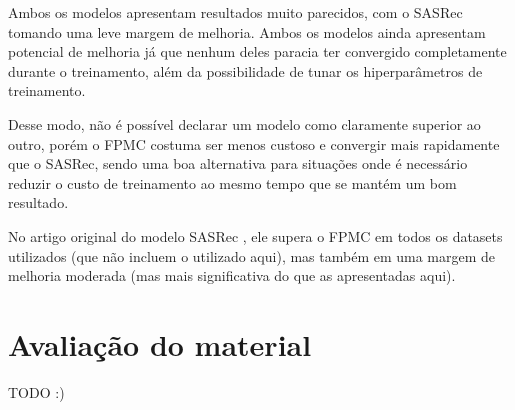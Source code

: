 Ambos os modelos apresentam resultados muito parecidos, com o SASRec tomando uma
leve margem de melhoria. Ambos os modelos ainda apresentam potencial de melhoria
já que nenhum deles paracia ter convergido completamente durante o treinamento,
além da possibilidade de tunar os hiperparâmetros de treinamento.

Desse modo, não é possível declarar um modelo como claramente superior ao outro,
porém o FPMC costuma ser menos custoso e convergir mais rapidamente que o SASRec,
sendo uma boa alternativa para situações onde é necessário reduzir o custo de
treinamento ao mesmo tempo que se mantém um bom resultado.

No artigo original do modelo SASRec \cite{sasrec}, ele supera o FPMC em
todos os datasets utilizados (que não incluem o utilizado aqui), mas também em
uma margem de melhoria moderada (mas mais significativa do que as apresentadas
aqui).

\section*{Avaliação do material}

TODO :)
